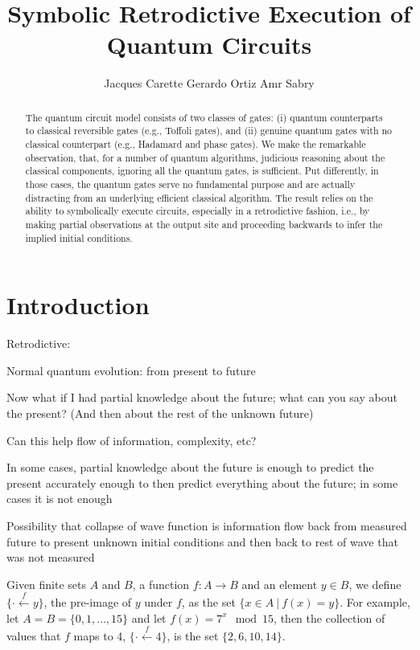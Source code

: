\documentclass{article}
\title{Symbolic Retrodictive Execution of Quantum Circuits}
\author{Jacques Carette \qquad Gerardo Ortiz \qquad Amr Sabry}
\newcommand{\preim}[2]{\{\cdot\stackrel{#1}{\longleftarrow}{#2}\}}
\begin{document}
\maketitle

\begin{abstract}
The quantum circuit model consists of two classes of gates: (i)
quantum counterparts to classical reversible gates (e.g., Toffoli
gates), and (ii) genuine quantum gates with no classical counterpart
(e.g., Hadamard and phase gates). We make the remarkable observation,
that, for a number of quantum algorithms, judicious reasoning about
the classical components, ignoring all the quantum gates, is
sufficient. Put differently, in those cases, the quantum gates serve
no fundamental purpose and are actually distracting from an underlying
efficient classical algorithm. The result relies on the ability to
symbolically execute circuits, especially in a retrodictive fashion,
i.e., by making partial observations at the output site and proceeding
backwards to infer the implied initial conditions.
\end{abstract}

\section{Introduction}

Retrodictive: 

Normal quantum evolution: from present to future

Now what if I had partial knowledge about the future; what can you say
about the present? (And then about the rest of the unknown future)

Can this help flow of information, complexity, etc?

In some cases, partial knowledge about the future is enough to predict
the present accurately enough to then predict everything about the
future; in some cases it is not enough

Possibility that collapse of wave function is information flow back
from measured future to present unknown initial conditions and then
back to rest of wave that was not measured









Given finite sets $A$ and $B$, a function $f : A \rightarrow B$ and an
element $y \in B$, we define $\preim{f}{y}$, the pre-image of $y$
under $f$, as the set $\{ x \in A ~|~ f(x) = y \}$. For example, let
$A = B = \{0,1,\ldots,15\}$ and let $f(x) = 7^x \mod 15$, then the
collection of values that $f$ maps to 4, $\preim{f}{4}$, is the set
$\{ 2, 6, 10, 14 \}$.
\end{document}
